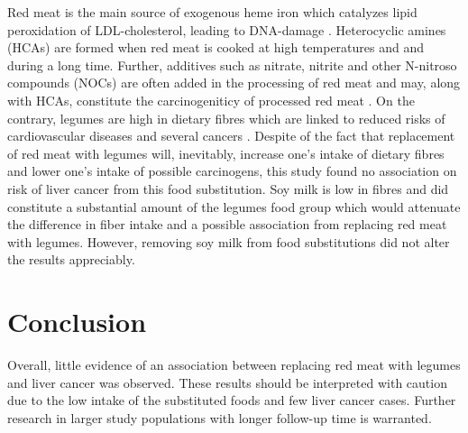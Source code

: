 \documentclass[nutrients,article,submit,moreauthors,pdftex]{Definitions/mdpi}
\begin{document}
Red meat is the main source of exogenous heme iron which catalyzes lipid
peroxidation of LDL-cholesterol, leading to DNA-damage \citep{Jeney2002}.
Heterocyclic amines (HCAs) are formed when red meat is cooked at high
temperatures and and during a long time. Further, additives such as
nitrate, nitrite and other N-nitroso compounds (NOCs) are often added in
the processing of red meat and may, along with HCAs, constitute the
carcinogeniticy of processed red meat \citep{Felton1997, Li2022, Seyyedsalehi2023}. On the contrary, legumes are high in dietary fibres
which are linked to reduced risks of cardiovascular diseases and several
cancers \citep{Dahm2024, Hu2023}. Despite of the fact that replacement of
red meat with legumes will, inevitably, increase one's intake of dietary
fibres and lower one's intake of possible carcinogens, this study found
no association on risk of liver cancer from this food substitution. Soy
milk is low in fibres and did constitute a substantial amount of the
legumes food group which would attenuate the difference in fiber intake
and a possible association from replacing red meat with legumes.
However, removing soy milk from food substitutions did not alter the
results appreciably.

\hypertarget{sec5}{%
\section{Conclusion}\label{sec5}}

Overall, little evidence of an association between replacing red meat
with legumes and liver cancer was observed. These results should be
interpreted with caution due to the low intake of the substituted foods
and few liver cancer cases. Further research in larger study populations
with longer follow-up time is warranted.


\vspace{6pt}



\end{document}
